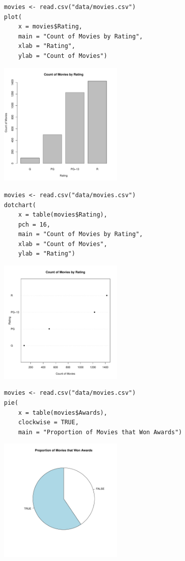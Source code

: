 \documentclass[a4paper, captions=tableheading]{tufte-book}
\begin{document}
\begin{verbatim}
movies <- read.csv("data/movies.csv")
plot(
	x = movies$Rating,
	main = "Count of Movies by Rating",
	xlab = "Rating",
	ylab = "Count of Movies")
\end{verbatim}

\includegraphics[height=6cm]{img/1-cat-base-01.pdf}


\begin{verbatim}
movies <- read.csv("data/movies.csv")
dotchart(
	x = table(movies$Rating),
	pch = 16,
	main = "Count of Movies by Rating",
	xlab = "Count of Movies",
	ylab = "Rating")
\end{verbatim}

\includegraphics[height=6cm]{img/1-cat-base-02.pdf}


\begin{verbatim}
movies <- read.csv("data/movies.csv")
pie(
	x = table(movies$Awards),
	clockwise = TRUE,
	main = "Proportion of Movies that Won Awards")
\end{verbatim}

\includegraphics[height=6cm]{img/1-cat-base-03.pdf}
\end{document}
